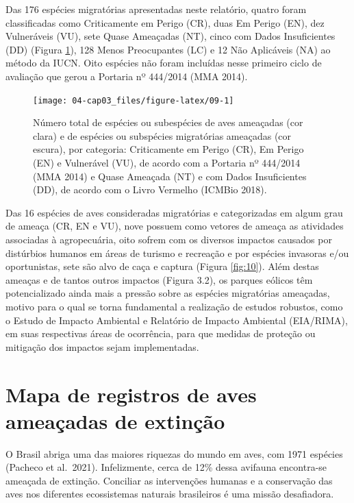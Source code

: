 \documentclass[
  oneside]{scrbook}
\begin{document}
Das 176 espécies migratórias apresentadas neste relatório, quatro foram classificadas como Criticamente em Perigo (CR), duas Em Perigo (EN), dez Vulneráveis (VU), sete Quase Ameaçadas (NT), cinco com Dados Insuficientes (DD) (Figura \ref{fig:09}), 128 Menos Preocupantes (LC) e 12 Não Aplicáveis (NA) ao método da IUCN. Oito espécies não foram incluídas nesse primeiro ciclo de avaliação que gerou a Portaria nº 444/2014 (MMA 2014).

\begin{figure}[H]

{\centering \texttt{[image: 04-cap03\_files/figure-latex/09-1]} 

}

\caption{Número total de espécies ou subespécies de aves ameaçadas (cor clara) e de espécies ou subspécies migratórias ameaçadas (cor escura), por categoria: Criticamente em Perigo (CR), Em Perigo (EN) e Vulnerável (VU), de acordo com a Portaria nº 444/2014 (MMA 2014) e Quase Ameaçada (NT) e com Dados Insuficientes (DD), de acordo com o Livro Vermelho (ICMBio 2018).}\label{fig:09}
\end{figure}

Das 16 espécies de aves consideradas migratórias e categorizadas em algum grau de ameaça (CR, EN e VU), nove possuem como vetores de ameaça as atividades associadas à agropecuária, oito sofrem com os diversos impactos causados por distúrbios humanos em áreas de turismo e recreação e por espécies invasoras e/ou oportunistas, sete são alvo de caça e captura (Figura \ref{fig:10}). Além destas ameaças e de tantos outros impactos (Figura 3.2), os parques eólicos têm potencializado ainda mais a pressão sobre as espécies migratórias ameaçadas, motivo para o qual se torna fundamental a realização de estudos robustos, como o Estudo de Impacto Ambiental e Relatório de Impacto Ambiental (EIA/RIMA), em suas respectivas áreas de ocorrência, para que medidas de proteção ou mitigação dos impactos sejam implementadas.

\hypertarget{mapa-de-registros-de-aves-ameauxe7adas-de-extinuxe7uxe3o}{%
\section{Mapa de registros de aves ameaçadas de extinção}\label{mapa-de-registros-de-aves-ameauxe7adas-de-extinuxe7uxe3o}}

O Brasil abriga uma das maiores riquezas do mundo em aves, com 1971 espécies (Pacheco et al.~2021). Infelizmente, cerca de 12\% dessa avifauna encontra-se ameaçada de extinção. Conciliar as intervenções humanas e a conservação das aves nos diferentes ecossistemas naturais brasileiros é uma missão desafiadora.
\end{document}

